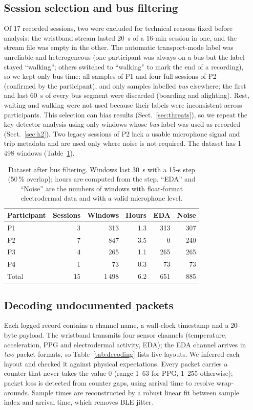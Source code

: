 \documentclass[runningheads]{llncs}
\begin{document}
\subsection{Session selection and bus filtering}
\label{sec:selection}
Of 17 recorded sessions, two were excluded for technical reasons fixed before analysis: the wristband stream lasted 20~s of a 16-min session in one, and the stream file was empty in the other. The automatic transport-mode label was unreliable and heterogeneous (one participant was always on a bus but the label stayed ``walking''; others switched to ``walking'' to mark the end of a recording), so we kept only bus time: all samples of P1 and four full sessions of P2 (confirmed by the participant), and only samples labelled \emph{bus} elsewhere; the first and last 60~s of every bus segment were discarded (boarding and alighting). Rest, waiting and walking were not used because their labels were inconsistent across participants. This selection can bias results (Sect.~\ref{sec:threats}), so we repeat the key detector analysis using only windows whose \emph{bus} label was used as recorded (Sect.~\ref{sec:h2}). Two legacy sessions of P2 lack a usable microphone signal and trip metadata and are used only where noise is not required. The dataset has 1\,498 windows (Table~\ref{tab:data}).

\begin{table}[t]
\caption{Dataset after bus filtering. Windows last 30~s with a 15-s step (50\,\% overlap); hours are computed from the step. ``EDA'' and ``Noise'' are the numbers of windows with float-format electrodermal data and with a valid microphone level.}
\label{tab:data}
\centering
\setlength{\tabcolsep}{7pt}
\begin{tabular}{lrrrrr}
\toprule
Participant & Sessions & Windows & Hours & EDA & Noise\\
\midrule
P1 & 3 & 313 & 1.3 & 313 & 307\\
P2 & 7 & 847 & 3.5 & 0 & 240\\
P3 & 4 & 265 & 1.1 & 265 & 265\\
P4 & 1 & 73 & 0.3 & 73 & 73\\
\midrule
Total & 15 & 1\,498 & 6.2 & 651 & 885\\
\bottomrule
\end{tabular}
\end{table}

\subsection{Decoding undocumented packets}
\label{sec:decoding}
Each logged record contains a channel name, a wall-clock timestamp and a 20-byte payload. The wristband transmits four sensor channels (temperature, acceleration, PPG and electrodermal activity, EDA); the EDA channel arrives in \emph{two} packet formats, so Table~\ref{tab:decoding} lists five layouts. We inferred each layout and checked it against physical expectations. Every packet carries a counter that never takes the value 0 (range 1--63 for PPG, 1--255 otherwise); packet loss is detected from counter gaps, using arrival time to resolve wrap-arounds. Sample times are reconstructed by a robust linear fit between sample index and arrival time, which removes BLE jitter.
\end{document}
